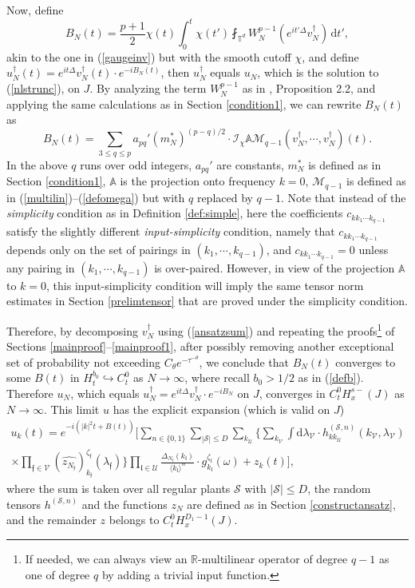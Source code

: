 \documentclass[11 pt,reqno]{amsart}
\theoremstyle{definition}
\theoremstyle{remark}
\numberwithin{equation}{section}
\newcommand{\Sc}{\mathcal{S}}
\newcommand{\Ic}{\mathcal{I}}
\newcommand{\Uc}{\mathcal{U}}
\newcommand{\Vc}{\mathcal{V}}
\renewcommand{\Mc}{\mathcal{M}}
\newcommand{\Tb}{\mathbb{T}}
\newcommand{\Rb}{\mathbb{R}}
\newcommand{\Ab}{\mathbb{A}}
\newcommand{\ff}{\mathfrak{f}}
\newcommand{\lf}{\mathfrak{l}}
\begin{document}
{Now, define
\begin{equation}\label{defbnt}B_N(t)=\frac{p+1}{2}\chi(t)\int_0^t\chi(t')\fint_{\Tb^d}W_N^{p-1}(e^{it'\Delta}v_N^\dagger)\,\mathrm{d}t',\end{equation} akin to the one in (\ref{gaugeinv}) but with the smooth cutoff $\chi$, and define $u_N^\dagger(t)=e^{it\Delta}v_N^\dagger(t)\cdot e^{-iB_N(t)}$, then $u_N^\dagger$ equals $u_N$, which is the solution to (\ref{nlstrunc}), on $J$. By analyzing the term $W_N^{p-1}$ as in \cite{DNY}, Proposition 2.2, and applying the same calculations as in Section \ref{condition1}, we can rewrite $B_N(t)$ as
\begin{equation}\label{formbnt}B_N(t)=\sum_{3\leq q\leq p}a_{pq}'(m_N^*)^{(p-q)/2}\cdot\Ic_\chi\Ab\Mc_{q-1}(v_N^\dagger,\cdots,v_N^\dagger)(t).\end{equation} In the above $q$ runs over odd integers, $a_{pq}'$ are constants, $m_N^*$ is defined as in Section \ref{condition1}, $\Ab$ is the projection onto frequency $k=0$, $\Mc_{q-1}$ is defined as in (\ref{multilin})--(\ref{defomega}) but with $q$ replaced by $q-1$. Note that instead of  the \emph{simplicity} condition as in Definition \ref{def:simple}, here the coefficients $c_{kk_1\cdots k_{q-1}}$ satisfy the slightly different \emph{input-simplicity} condition, namely that $c_{kk_1\cdots k_{q-1}}$ depends only on the set of pairings in $(k_1,\cdots,k_{q-1})$, and $c_{kk_1\cdots k_{q-1}}=0$ unless any pairing in $(k_1,\cdots,k_{q-1})$ is over-paired. However, in view of the projection $\Ab$ to $k=0$, this input-simplicity condition will imply the same tensor norm estimates in Section \ref{prelimtensor} that are proved under the simplicity condition.

Therefore, by decomposing $v_N^\dagger$ using (\ref{ansatzsum}) and repeating the proofs\footnote{If needed, we can always view an $\Rb$-multilinear operator of degree $q-1$ as one of degree $q$ by adding a trivial input function.} of Sections \ref{mainproof}--\ref{mainproof1}, after possibly removing another exceptional set of probability not exceeding $C_\theta e^{-\tau^{-\theta}}$, we conclude that $B_N(t)$ converges to some $B(t)$ in $H_t^{b_0}\hookrightarrow C_t^0$ as $N\to\infty$, where recall $b_0>1/2$ as in (\ref{defb}). Therefore $u_N$, which equals $u_N^\dagger=e^{it\Delta}v_N^\dagger\cdot e^{-iB_N}$ on $J$, converges in $C_t^0H_x^{s-}(J)$ as $N\to\infty$. This limit $u$ has the explicit expansion (which is valid on $J$)
\begin{multline}\label{expansionofu}
u_k(t)=e^{-i(|k|^2t+B(t))}\bigg[\sum_{n\in\{0,1\}}\sum_{|\Sc|\leq D}\sum_{k_\Uc}\bigg\{\sum_{k_\Vc}\int\mathrm{d}\lambda_\Vc\cdot h_{kk_\Uc}^{(\Sc,n)}(k_\Vc,\lambda_\Vc)\\\times\prod_{\ff\in\Vc}(\widehat{z_{N_\ff}})_{k_\ff}^{\zeta_\ff}(\lambda_\ff)\bigg\}\prod_{\lf\in\Uc}\frac{\Delta_{N_\lf}(k_\lf)}{\langle k_\lf\rangle^\alpha}\cdot g_{k_\lf}^{\zeta_\lf}(\omega)+z_k(t)\bigg],
\end{multline}where the sum is taken over all regular plants $\Sc$ with $|\Sc|\leq D$, the random tensors $h^{(\Sc,n)}$ and the functions $z_N$ are defined as in Section \ref{constructansatz}, and the remainder $z$ belongs to $C_t^0H_x^{D_1-1}(J)$.

}
\end{document}
